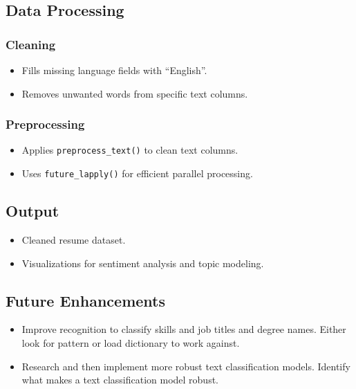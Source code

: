 \documentclass[
]{article}
\providecommand{\tightlist}{%
  \setlength{\itemsep}{0pt}\setlength{\parskip}{0pt}}
\begin{document}
\subsection{Data Processing}\label{data-processing}

\subsubsection{Cleaning}\label{cleaning}

\begin{itemize}
\tightlist
\item
  Fills missing language fields with ``English''.
\item
  Removes unwanted words from specific text columns.
\end{itemize}

\subsubsection{Preprocessing}\label{preprocessing}

\begin{itemize}
\tightlist
\item
  Applies \texttt{preprocess\_text()} to clean text columns.
\item
  Uses \texttt{future\_lapply()} for efficient parallel processing.
\end{itemize}

\subsection{Output}\label{output}

\begin{itemize}
\tightlist
\item
  Cleaned resume dataset.
\item
  Visualizations for sentiment analysis and topic modeling.
\end{itemize}

\subsection{Future Enhancements}\label{future-enhancements}

\begin{itemize}
\tightlist
\item
  Improve recognition to classify skills and job titles and degree
  names. Either look for pattern or load dictionary to work against.
\item
  Research and then implement more robust text classification models.
  Identify what makes a text classification model robust.
\end{itemize}
\end{document}
